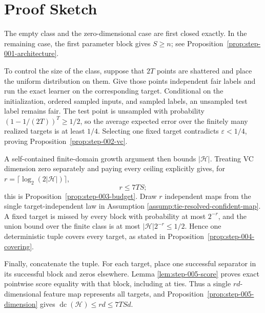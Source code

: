 \section{Proof Sketch}
\label{sec:proof-sketch}

The empty class and the zero-dimensional case are first closed exactly.
In the remaining case, the first parameter block gives $S\geq n$; see
Proposition~\ref{prop:step-001-architecture}.

To control the size of the class, suppose that $2T$ points are shattered and
place the uniform distribution on them.  Give those points independent fair
labels and run the exact learner on the corresponding target.  Conditional on
the initialization, ordered sampled inputs, and sampled labels, an unsampled
test label remains fair.  The test point is unsampled with probability
$(1-1/(2T))^T\geq1/2$, so the average expected error over the finitely many
realized targets is at least $1/4$.  Selecting one fixed target contradicts
$\varepsilon<1/4$, proving Proposition~\ref{prop:step-002-vc}.

A self-contained finite-domain growth argument then bounds
$|\mathcal H|$.  Treating VC dimension zero separately and paying every
ceiling explicitly gives, for
$r=\lceil\log_2(2|\mathcal H|)\rceil$,
\[
r\leq7TS;
\]
this is Proposition~\ref{prop:step-003-budget}.  Draw $r$ independent maps
from the single target-independent law in Assumption
\ref{assump:tie-resolved-confident-map}.  A fixed target is missed by every
block with probability at most $2^{-r}$, and the union bound over the finite
class is at most $|\mathcal H|2^{-r}\leq1/2$.  Hence one deterministic tuple
covers every target, as stated in Proposition~\ref{prop:step-004-covering}.

Finally, concatenate the tuple.  For each target, place one successful
separator in its successful block and zeros elsewhere.  Lemma
\ref{lem:step-005-score} proves exact pointwise score equality with that
block, including at ties.  Thus a single $rd$-dimensional feature map represents
all targets, and Proposition~\ref{prop:step-005-dimension} gives
$\operatorname{dc}(\mathcal H)\leq rd\leq7TSd$.
